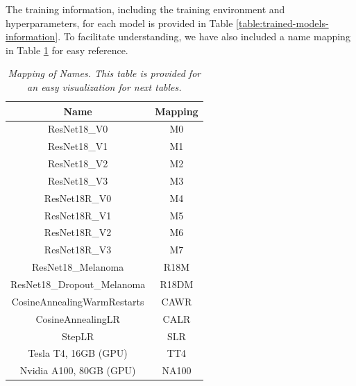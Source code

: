The training information, including the training environment and hyperparameters, for each model is provided in Table \ref{table:trained-models-information}. To facilitate understanding, we have also included a name mapping in Table \ref{table:mapping-names} for easy reference.

\begin{table}[H]
\centering
\begin{tabular}{cc}
    \toprule
\textbf{Name} & \textbf{Mapping} \\  \midrule
ResNet18\_V0 & M0 \\
ResNet18\_V1 & M1 \\
ResNet18\_V2 & M2 \\
ResNet18\_V3 & M3 \\
ResNet18R\_V0  & M4 \\
ResNet18R\_V1  & M5 \\
ResNet18R\_V2 & M6 \\
ResNet18R\_V3  & M7 \\
ResNet18\_Melanoma & R18M \\
ResNet18\_Dropout\_Melanoma & R18DM \\
CosineAnnealingWarmRestarts & CAWR \\
CosineAnnealingLR & CALR \\
StepLR & SLR \\
Tesla T4, 16GB (GPU) & TT4 \\
Nvidia A100, 80GB (GPU) & NA100 \\ \bottomrule
\end{tabular}
\caption[Mapping of Names.]{\textit{Mapping of Names. This table is provided for an easy visualization for next tables.}}
{\label{table:mapping-names}}
\end{table}

\newpage


